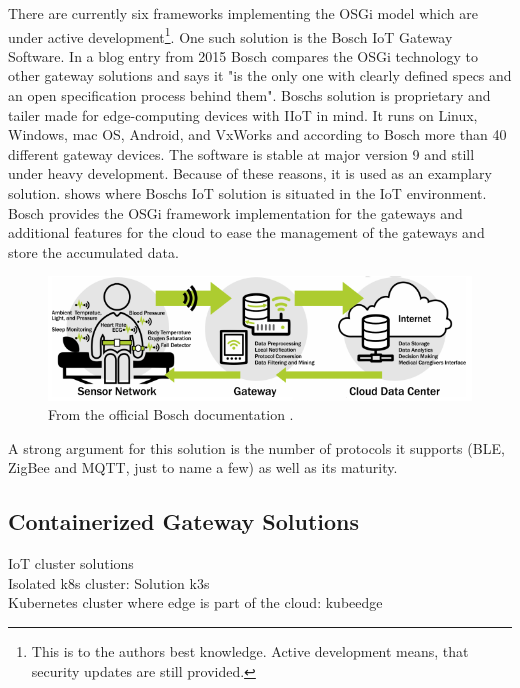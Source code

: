 There are currently six frameworks implementing the OSGi model which are under active development\footnote{This is to the authors best knowledge. Active development means, that security updates are still provided.}. One such solution is the Bosch IoT Gateway Software\cite{BoschIoT13:online}. In a blog entry from 2015 Bosch compares the OSGi technology to other gateway solutions and says it "is the only one with clearly defined specs and an open specification process behind them"\cite{boschBlogOSGi69:online}. Boschs solution is proprietary and tailer made for edge-computing devices with IIoT in mind\cite{OSGiforIoTBlog27:online}. It runs on Linux, Windows, mac OS, Android, and VxWorks and according to Bosch more than 40 different gateway devices\cite{BoschIoT13:online}. The software is stable at major version 9 and still under heavy development. Because of these reasons, it is used as an examplary solution.  shows where Boschs IoT solution is situated in the IoT environment. Bosch provides the OSGi framework implementation for the gateways and additional features for the cloud to ease the management of the gateways and store the accumulated data.
\begin{figure}[h!]
    \centering
    \includegraphics[scale=0.8]{figures/iotSetup.png}
    \caption{From the official Bosch documentation \cite{BoschIoT13:online}.}
    \label{fig:boschIoTGatewaySetup}
\end{figure}
A strong argument for this solution is the number of protocols it supports (BLE, ZigBee and MQTT, just to name a few) as well as its maturity.




\subsection{Containerized Gateway Solutions}

IoT cluster solutions\\
Isolated k8s cluster: Solution k3s\\
Kubernetes cluster where edge is part of the cloud: kubeedge\\



